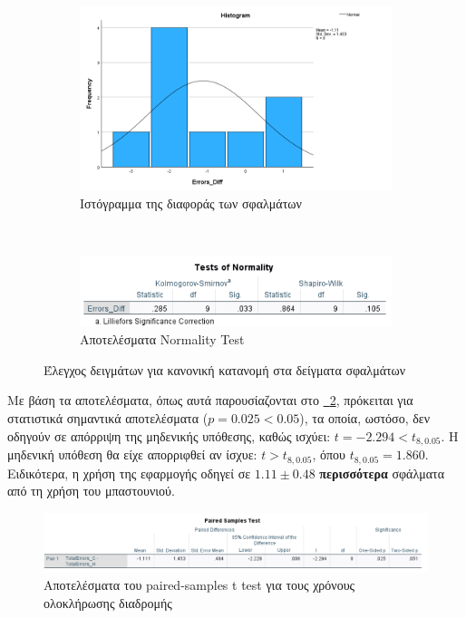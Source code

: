 \begin{figure}[!ht]
    \centering
    \begin{subfigure}{0.8\textwidth}
        \centering
        \includegraphics[width=1\linewidth]{./images/SA_Histogram_TotalErrorsDiff.png}
        \caption{Ιστόγραμμα της διαφοράς των σφαλμάτων}
    \end{subfigure}%
    \\
    \begin{subfigure}{0.8\textwidth}
        \centering
        \includegraphics[width=1\linewidth]{images/SA_NormalityTest_TotalErrorsDiff.png}
        \caption{Αποτελέσματα Normality Test}
    \end{subfigure}%
    \caption{Έλεγχος δειγμάτων για κανονική κατανομή στα δείγματα σφαλμάτων}\label{fig:SANormalDistributionTE}
\end{figure}

Με βάση τα αποτελέσματα, όπως αυτά παρουσίαζονται στο \hyperref[fig:SATTestTEDiff]{\schema~\ref*{fig:SATTestTEDiff}}, πρόκειται για στατιστικά σημαντικά αποτελέσματα ($p = 0.025 < 0.05$), τα οποία, ωστόσο, δεν οδηγούν σε απόρριψη της μηδενικής υπόθεσης, καθώς ισχύει: $t = -2.294 < t_{8,0.05}$. Η μηδενική υπόθεση θα είχε απορριφθεί αν ίσχυε: $t > t_{8,0.05}$, όπου $t_{8,0.05} = 1.860$. Ειδικότερα, η χρήση της εφαρμογής οδηγεί σε $1.11 \pm 0.48$ \textbf{περισσότερα} σφάλματα από τη χρήση του μπαστουνιού.

\begin{figure}[!ht]
    \centering
    \includegraphics[width=1\linewidth]{./images/SA_TTestResult_TotalErrorsDiff.png}
    \caption{Αποτελέσματα του paired-samples t test για τους χρόνους ολοκλήρωσης διαδρομής}\label{fig:SATTestTEDiff}
\end{figure}

